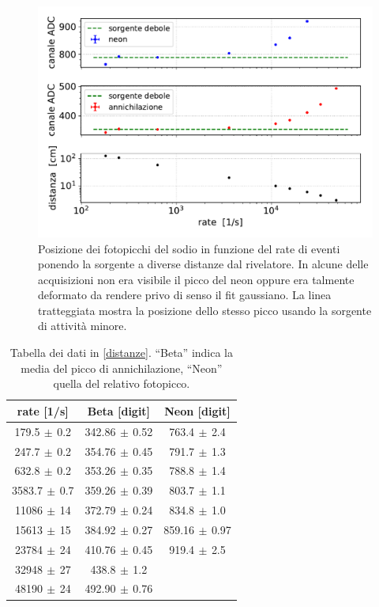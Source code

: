\begin{figure}[h]
\centering
\includegraphics[width=28 em]{immagini/naforte}
\caption{Posizione dei fotopicchi del sodio in funzione del rate di eventi ponendo la sorgente a diverse distanze dal rivelatore. In alcune delle acquisizioni non era visibile il picco del neon oppure era talmente deformato da rendere privo di senso il fit gaussiano. La linea tratteggiata mostra la posizione dello stesso picco usando la sorgente di attività minore.}
\label{distanze}
\end{figure}

\begin{table}[h]
\centering
\begin{tabular}{c|c|c}
rate [1/s] & Beta [digit] & Neon [digit] \\
\hline
 179.5$\,\pm\,$0.2 & 342.86$\,\pm\,$0.52 & 763.4$\,\pm\,$2.4 \\
 247.7$\,\pm\,$0.2 & 354.76$\,\pm\,$0.45 & 791.7$\,\pm\,$1.3 \\
 632.8$\,\pm\,$0.2 & 353.26$\,\pm\,$0.35 & 788.8$\,\pm\,$1.4 \\
3583.7$\,\pm\,$0.7 & 359.26$\,\pm\,$0.39 & 803.7$\,\pm\,$1.1 \\
  11086$\,\pm\,$14 & 372.79$\,\pm\,$0.24 & 834.8$\,\pm\,$1.0 \\
  15613$\,\pm\,$15 & 384.92$\,\pm\,$0.27 & 859.16$\,\pm\,$0.97 \\
  23784$\,\pm\,$24 & 410.76$\,\pm\,$0.45 & 919.4$\,\pm\,$2.5 \\
  32948$\,\pm\,$27 & 438.8$\,\pm\,$1.2 &         \\
  48190$\,\pm\,$24 & 492.90$\,\pm\,$0.76 &        
\end{tabular}

\caption{Tabella dei dati in \autoref{distanze}. ``Beta'' indica la media del picco di annichilazione, ``Neon'' quella del relativo fotopicco.}
\label{tabella forte}
\end{table}


